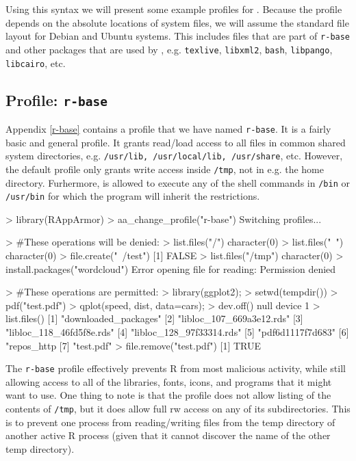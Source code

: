 \documentclass[article]{jss}
\begin{document}
Using this syntax we will present some example profiles for .
Because the profile depends on the absolute locations of system files, we will
assume the standard file layout for Debian and Ubuntu systems. This includes
files that are part of \texttt{r-base} and other packages that are used by
, e.g. \texttt{texlive}, \texttt{libxml2}, \texttt{bash},
\texttt{libpango}, \texttt{libcairo}, etc.

\subsection[Profile: r-base]{Profile: \texttt{r-base}}

Appendix \ref{r-base} contains a profile that we have named \texttt{r-base}.
It is a fairly basic and general profile. It grants read/load access to all
files in common shared system directories, e.g. \texttt{/usr/lib,
/usr/local/lib, /usr/share}, etc. However, the default profile only grants
write access inside \texttt{/tmp}, not in e.g. the home directory. Furhermore,
 is allowed to execute any of the shell commands in \texttt{/bin}
or \texttt{/usr/bin} for which the program will inherit the restrictions.

\begin{CodeChunk}
\begin{CodeInput}
> library(RAppArmor)
> aa_change_profile("r-base")
Switching profiles...

> #These operations will be denied:
> list.files("/")
character(0)
> list.files("~")
character(0)
> file.create("~/test")
[1] FALSE
> list.files("/tmp")
character(0)
> install.packages("wordcloud")
Error opening file for reading: Permission denied

> #These operations are permitted:
> library(ggplot2);
> setwd(tempdir())
> pdf("test.pdf")
> qplot(speed, dist, data=cars);
> dev.off()
null device
          1
> list.files()
[1] "downloaded_packages"
[2] "libloc_107_669a3e12.rds"
[3] "libloc_118_46fd5f8e.rds"
[4] "libloc_128_97f33314.rds"
[5] "pdf6d1117f7d683"
[6] "repos_http%
[7] "test.pdf"
> file.remove("test.pdf")
[1] TRUE
\end{CodeInput}
\end{CodeChunk}

The \texttt{r-base} profile effectively prevents R from most malicious
activity, while still allowing access to all of the libraries, fonts, icons, and
programs that it might want to use. One thing to note is that the profile
does not allow listing of the contents of \texttt{/tmp}, but it does allow full
rw access on any of its subdirectories. This is to prevent one process from
reading/writing files from the temp directory of another active R process (given
that it cannot discover the name of the other temp directory).
\end{document}
